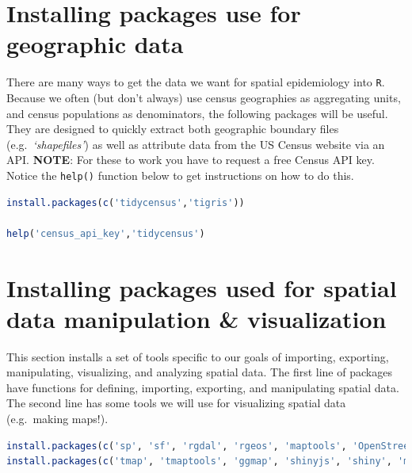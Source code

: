 \documentclass[
]{book}
\newcommand{\passthrough}[1]{#1}
\begin{document}
\hypertarget{installing-packages-use-for-geographic-data}{%
\section*{Installing packages use for geographic data}\label{installing-packages-use-for-geographic-data}}

There are many ways to get the data we want for spatial epidemiology into \passthrough{\lstinline!R!}. Because we often (but don't always) use census geographies as aggregating units, and census populations as denominators, the following packages will be useful. They are designed to quickly extract both geographic boundary files (e.g.~\emph{`shapefiles'}) as well as attribute data from the US Census website via an API. \textbf{NOTE}: For these to work you have to request a free Census API key. Notice the \passthrough{\lstinline!help()!} function below to get instructions on how to do this.

\begin{lstlisting}[language=R]
install.packages(c('tidycensus','tigris')) 

help('census_api_key','tidycensus')
\end{lstlisting}

\hypertarget{installing-packages-used-for-spatial-data-manipulation-visualization}{%
\section*{Installing packages used for spatial data manipulation \& visualization}\label{installing-packages-used-for-spatial-data-manipulation-visualization}}

This section installs a set of tools specific to our goals of importing, exporting, manipulating, visualizing, and analyzing spatial data. The first line of packages have functions for defining, importing, exporting, and manipulating spatial data. The second line has some tools we will use for visualizing spatial data (e.g.~making maps!).

\begin{lstlisting}[language=R]
install.packages(c('sp', 'sf', 'rgdal', 'rgeos', 'maptools', 'OpenStreetMap'))  
install.packages(c('tmap', 'tmaptools', 'ggmap', 'shinyjs', 'shiny', 'micromap')) 
\end{lstlisting}
\end{document}
